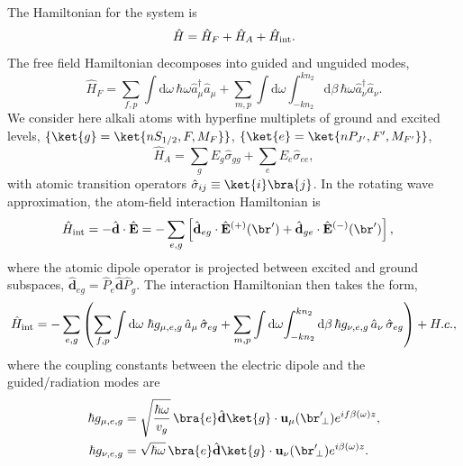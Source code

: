 \documentclass[]{report}
\newcommand{\inter}{{\rm int}}
\begin{document}
The Hamiltonian for the system is
\begin{equation}
\hat{H} = \hat{H}_F+\hat{H}_A + \hat{H}_{\inter}.
\end{equation}
The free field Hamiltonian decomposes into guided and unguided modes, 
	\begin{equation}
		\hat{H}_F = \sum_{f,p}\int \mathrm{d}\omega \, \hbar \omega \hat{a}^\dagger_\mu \hat{a}_\mu 
+\sum_{m,p} \int \mathrm{d}\omega  \int_{-k n_2}^{k n_2} \mathrm{d}\beta \, \hbar \omega 
\hat{a}^\dagger_\nu \hat{a}_\nu.
	\end{equation}
We consider here alkali atoms with hyperfine multiplets of ground and excited levels, $\{ 
\ket{g}=\ket{nS_{1/2}, F, M_F}\}$, $\{ \ket{e} =\ket{nP_{J'}, F', M_{F'}}\}$,
	\begin{equation}
		\hat{H}_A  = \sum_g E_g \hat{\sigma}_{gg} + \sum_e E_e \hat{\sigma}_{ee},
	\end{equation}
with atomic transition operators $\hat{\sigma}_{ij} \equiv \ket{i}\bra{j}$.  In the rotating wave approximation, the atom-field interaction Hamiltonian is
	\begin{align}
		\hat{H}_{\inter} &= -\hat{\mathbf{d}}\cdot \hat{\mathbf{E}} =-\sum_{e,g} \left[ \hat{\mathbf{d}}_{eg}\cdot 
\hat{\mathbf{E}}^{(+)}(\br')+\hat{\mathbf{d}}_{ge}\cdot \hat{\mathbf{E}}^{(-)}(\br') \right],
	\end{align}
where the atomic dipole operator is projected between excited and ground subspaces, $\hat{\mathbf{d}}_{eg}= \hat{P}_e \hat{\mathbf{d}} \hat{P}_g $. The interaction Hamiltonian then takes the form, 
\begin{equation}
	\hat{H}_{\inter} = -\sum_{e,g} \left(\sum_{f,p} \int\mathrm{d}\omega \; \hbar g_{\mu, e,g}\, \hat{a}_\mu  \, 
		\hat{\sigma}_{eg}+ \sum_{m,p} \int\mathrm{d}\omega \! \int_{-kn_2}^{kn_2}\mathrm{d}\beta \,  \hbar 
g_{\nu, e,g}\, \hat{a}_\nu \, \hat{\sigma}_{eg}\right) + {H.c.},
	\end{equation}
where the coupling constants between the electric dipole and the guided/radiation modes are
\begin{subequations} \label{Eq::CouplingConstants}
	\begin{align}
		\hbar g_{\mu, e,g} &= \sqrt{\frac{\hbar \omega}{ v_g  }}\, \bra{e} \hat{\mathbf{d}} \ket{g} 
\cdot\mathbf{u}_\mu ( \br'\!_\perp ) e^{i f \beta(\omega)z} , \\
		\hbar g_{\nu, e,g} &= \sqrt{  \hbar \omega } \, \bra{e} \hat{\mathbf{d}} \ket{g} \cdot \mathbf{u}_\nu ( \br'\!_\perp ) e^{i\beta(\omega)z}  .
	\end{align}
\end{subequations}
\end{document}
